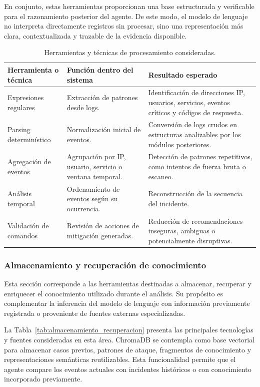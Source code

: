 En conjunto, estas herramientas proporcionan una base estructurada y verificable para el razonamiento posterior del agente. De este modo, el modelo de lenguaje no interpreta directamente registros sin procesar, sino una representación más clara, contextualizada y trazable de la evidencia disponible.

\begin{table}[H]
\centering
\caption{Herramientas y técnicas de procesamiento consideradas.}
\label{tab:herramientas_procesamiento}
\renewcommand{\arraystretch}{1.25}
\begin{tabularx}{\textwidth}{p{2.4cm} X X}
\toprule
\textbf{Herramienta o técnica} & \textbf{Función dentro del sistema} & \textbf{Resultado esperado} \\
\midrule
Expresiones regulares & Extracción de patrones desde logs. & Identificación de direcciones IP, usuarios, servicios, eventos críticos y códigos de respuesta. \\
\midrule
Parsing determinístico & Normalización inicial de eventos. & Conversión de logs crudos en estructuras analizables por los módulos posteriores. \\
\midrule
Agregación de eventos & Agrupación por IP, usuario, servicio o ventana temporal. & Detección de patrones repetitivos, como intentos de fuerza bruta o escaneo. \\
\midrule
Análisis temporal & Ordenamiento de eventos según su ocurrencia. & Reconstrucción de la secuencia del incidente. \\
\midrule
Validación de comandos & Revisión de acciones de mitigación generadas. & Reducción de recomendaciones inseguras, ambiguas o potencialmente disruptivas. \\
\bottomrule
\end{tabularx}
\end{table}

\subsubsection{Almacenamiento y recuperación de conocimiento}

Esta sección corresponde a las herramientas destinadas a almacenar, recuperar y enriquecer el conocimiento utilizado durante el análisis. Su propósito es complementar la inferencia del modelo de lenguaje con información previamente registrada o proveniente de fuentes externas especializadas.

La Tabla~\ref{tab:almacenamiento_recuperacion} presenta las principales tecnologías y fuentes consideradas en esta área. ChromaDB se contempla como base vectorial para almacenar casos previos, patrones de ataque, fragmentos de conocimiento y representaciones semánticas reutilizables. Esta funcionalidad permite que el agente compare los eventos actuales con incidentes históricos o con conocimiento incorporado previamente.

